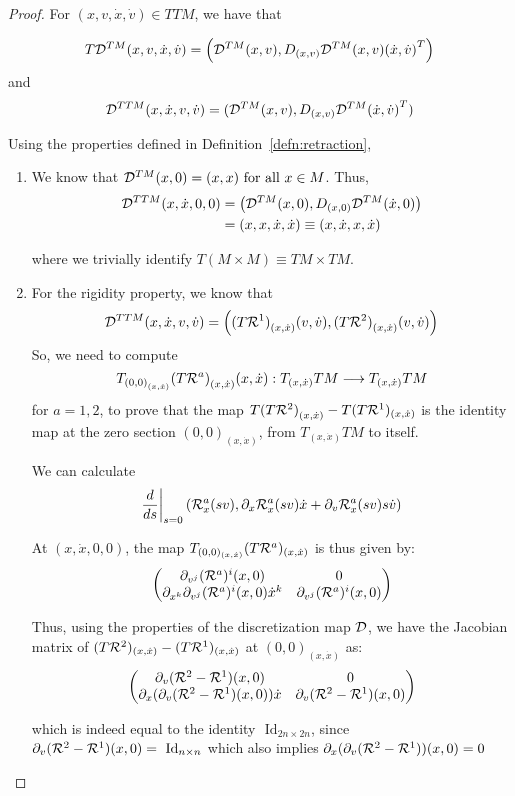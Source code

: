 \begin{proof}
  For $(x,v,\dot{x}, \dot{v}) \in TTM$, we have that 
  
  \[T\mathcal{D}^{TM}(x,v,\dot{x}, \dot{v}) = \left( \mathcal{D}^{TM}(x,v), D_{(x,v)} \mathcal{D}^{TM}(x,v) {(\dot{x}, \dot{v})}^T \right)\] and
  \[
    \mathcal{D}^{TTM}(x, \dot{x}, v, \dot{v}) = (\mathcal{D}^{TM}(x,v), D_{(x,v)}\mathcal{D}^{TM}{(\dot{x}, \dot{v})}^T) 
  \]

  Using the properties defined in Definition~\eqref{defn:retraction},  
  \begin{enumerate}
      \item We know that $\D^{TM}(x, 0) = (x,x) \ \forall x \in M$. Thus,
      \begin{equation*}
      \begin{split}
          \mathcal{D}^{TTM}(x,\dot{x}, 0, 0) & = \left( \mathcal{D}^{TM}(x, 0), D_{(x,0)} \mathcal{D}^{TM}(\dot{x}, 0) \right) \\
          & = (x,x, \dot{x}, \dot{x}) \equiv (x, \dot{x}, x, \dot{x})
      \end{split}
      \end{equation*}
       
      where we trivially identify $T(M \times M) \equiv TM \times TM$.
      \item For the rigidity property, we know that
      \[\mathcal{D}^{TTM}(x, \dot{x}, v, \dot{v}) = \left({(T\mathcal{R}^1)}_{(x,\dot{x})}(v, \dot{v}), {(T\mathcal{R}^2)}_{(x,\dot{x})}(v, \dot{v}) \right)\]
      So, we need to compute 
      \[T_{{(0,0)}_{(x,\dot{x})}}{(T\mathcal{R}^a)}_{(x, \dot{x})}(x, \dot{x}) : T_{(x, \dot{x})}TM \longrightarrow T_{(x, \dot{x})}TM\]
      for $a=1,2$, to prove that the map ${T(T\mathcal{R}^2)}_{(x,\dot{x})} - T(T\mathcal{R}^1)_{(x, \dot{x})}$ is the identity map at the zero section $(0,0)_{(x,\dot{x})}$, from $T_{(x, \dot{x})} TM$ to itself.

      We can calculate 
          \[\dfrac{d}{ds}\bigg|_{s=0} \left( \mathcal{R}^a_x( sv), \partial_{x} \mathcal{R}^a_x(sv) \dot{x} + \partial_v \mathcal{R}^a_x(sv) s \dot{v} \right)\]
      
      At $(x, \dot{x}, 0, 0)$, the map $T_{(0,0)_{(x, \dot{x})}}(T\mathcal{R}^a)_{(x, \dot{x})}$ is thus given by:
      \[\begin{pmatrix}
      \partial_{v^j}(\mathcal{R}^a)^i(x, 0) & 0 \\
      \partial_{x^k} \partial_{v^j} (\mathcal{R}^a)^i(x,0) \dot{x}^k & \partial_{v^j}(\mathcal{R}^a)^i(x,0)
      \end{pmatrix}\]
      
      \vspace{-1mm}
      Thus, using the properties of the discretization map $\mathcal{D}$, we have the Jacobian matrix of $(T\mathcal{R}^2)_{(x, \dot{x})} - (T\mathcal{R}^1)_{(x, \dot{x})}$ at $(0,0)_{(x, \dot{x})}$ as:
      \[\begin{pmatrix}
      \partial_{v}(\mathcal{R}^2-\mathcal{R}^1)(x,0) & 0 \\
      \partial_x(\partial_v(\mathcal{R}^2 - \mathcal{R}^1)(x,0))\dot{x} & \partial_v (\mathcal{R}^2-\mathcal{R}^1)(x,0)
      \end{pmatrix}
      \]

      \vspace{-1mm}
      which is indeed equal to the identity $\text{ Id}_{2n \times 2n}$, since $\partial_v (\mathcal{R}^2-\mathcal{R}^1)(x,0) = \text{ Id}_{n \times n}$ which also implies $\partial_x(\partial_v(\mathcal{R}^2 - \mathcal{R}^1))(x,0) = 0$
  \end{enumerate}
\end{proof}
